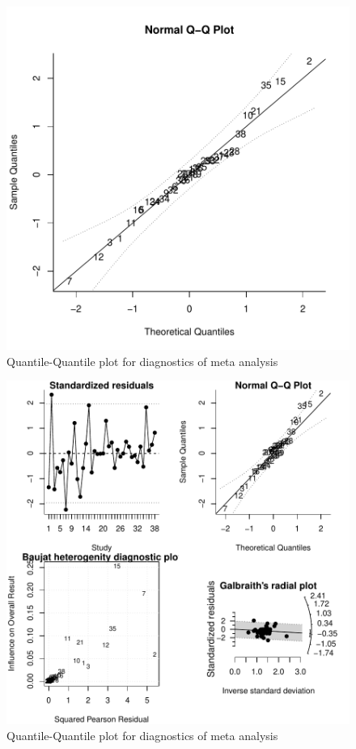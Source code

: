 \documentclass[11pt, a4paper]{article} %
\begin{document}
\begin{figure}
\captionsetup{width=0.6\textwidth}
\centering
\includegraphics{sweave_document_TB-qqnorm}
\caption{Quantile-Quantile plot for diagnostics of meta analysis}
\end{figure}

\begin{figure}
\captionsetup{width=0.6\textwidth}
\centering
\includegraphics{sweave_document_TB-diagnostics}
\caption{Quantile-Quantile plot for diagnostics of meta analysis}
\end{figure}
\end{document}
